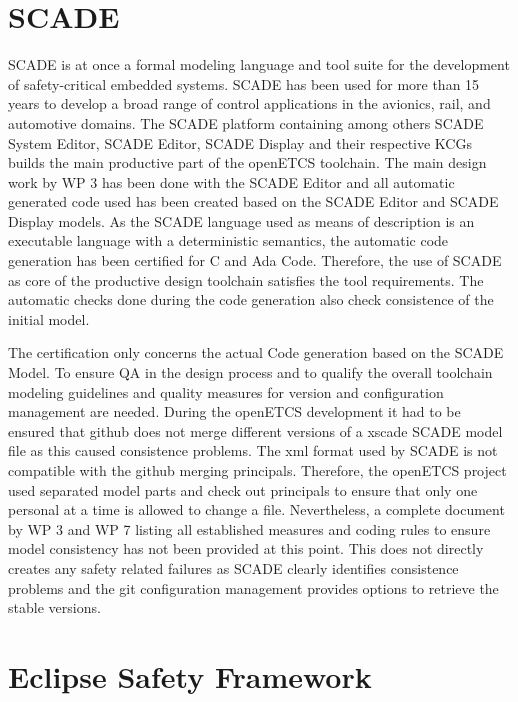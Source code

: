 \documentclass{template/openetcs_report}
\begin{document}
\section{SCADE}

SCADE is at once  a formal modeling language and tool suite for the development of safety-critical embedded systems. SCADE has been used for more than 15 years to develop a broad range of control applications in the avionics, rail, and automotive domains. The SCADE platform containing among others SCADE System Editor, SCADE Editor, SCADE Display and their respective KCGs builds the main productive part of the openETCS toolchain. The main design work by WP 3 has been done with the SCADE Editor and all automatic generated code used has been created based on the SCADE Editor and SCADE Display models. As the SCADE language used as means of description is  an executable language with a deterministic semantics, the automatic code generation has been certified for C and Ada Code. Therefore, the use of SCADE as core of the productive design toolchain satisfies the tool requirements. The automatic checks done during the code generation also check consistence of the initial model.

The certification only concerns the actual Code generation based on the SCADE Model. To ensure QA in the design process and to qualify the overall toolchain modeling guidelines and quality measures for version and configuration management are needed. During the openETCS development it had to be ensured that github does not merge different versions of a xscade SCADE model file as this caused consistence problems. The xml format used by SCADE is not compatible with the github merging principals. Therefore, the openETCS project used separated model parts and check out principals to ensure that only one personal at a time is allowed to change a file. Nevertheless, a complete document by WP 3 and WP 7 listing all established measures and coding rules to ensure model consistency has not been provided at this point. This does not directly creates any safety related failures as SCADE clearly identifies consistence problems and the git configuration management provides options to retrieve the stable versions.


\section{Eclipse Safety Framework}
\end{document}
